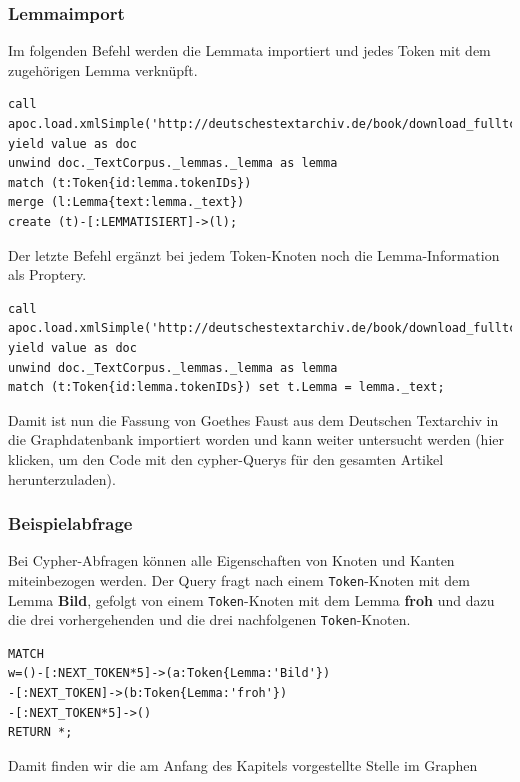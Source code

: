 \hypertarget{lemmaimport}{%
\subsubsection{Lemmaimport}\label{lemmaimport}}

Im folgenden Befehl werden die Lemmata importiert und jedes Token mit
dem zugehörigen Lemma verknüpft.

\begin{verbatim}
call apoc.load.xmlSimple('http://deutschestextarchiv.de/book/download_fulltcf/16181') yield value as doc
unwind doc._TextCorpus._lemmas._lemma as lemma
match (t:Token{id:lemma.tokenIDs})
merge (l:Lemma{text:lemma._text})
create (t)-[:LEMMATISIERT]->(l);
\end{verbatim}

Der letzte Befehl ergänzt bei jedem Token-Knoten noch die
Lemma-Information als Proptery.

\begin{verbatim}
call apoc.load.xmlSimple('http://deutschestextarchiv.de/book/download_fulltcf/16181') yield value as doc
unwind doc._TextCorpus._lemmas._lemma as lemma
match (t:Token{id:lemma.tokenIDs}) set t.Lemma = lemma._text;
\end{verbatim}

Damit ist nun die Fassung von Goethes Faust aus dem Deutschen Textarchiv
in die Graphdatenbank importiert worden und kann weiter untersucht
werden (hier klicken, um den Code mit den cypher-Querys für den gesamten
Artikel herunterzuladen).

\hypertarget{beispielabfrage}{%
\subsubsection{Beispielabfrage}\label{beispielabfrage}}

Bei Cypher-Abfragen können alle Eigenschaften von Knoten und Kanten
miteinbezogen werden. Der Query fragt nach einem \texttt{Token}-Knoten
mit dem Lemma \textbf{Bild}, gefolgt von einem \texttt{Token}-Knoten mit
dem Lemma \textbf{froh} und dazu die drei vorhergehenden und die drei
nachfolgenen \texttt{Token}-Knoten.

\begin{verbatim}
MATCH
w=()-[:NEXT_TOKEN*5]->(a:Token{Lemma:'Bild'})
-[:NEXT_TOKEN]->(b:Token{Lemma:'froh'})
-[:NEXT_TOKEN*5]->()
RETURN *;
\end{verbatim}

Damit finden wir die am Anfang des Kapitels vorgestellte Stelle im
Graphen

